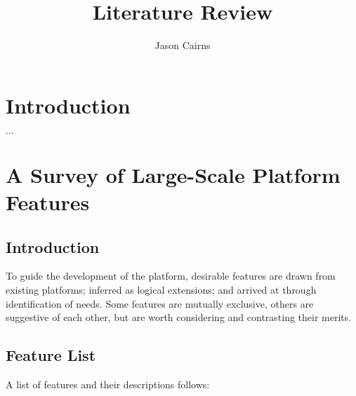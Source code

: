 \documentclass[a4paper,10pt]{article}
\begin{document}
\title{Literature Review}
\author{Jason Cairns}
  
\maketitle{}

\tableofcontents

\section{Introduction}

\(\dots\)

\section{A Survey of Large-Scale Platform Features}

\subsection{Introduction}\label{sec:intro}

To guide the development of the platform, desirable features are drawn from
existing platforms; inferred as logical extensions; and arrived at through
identification of needs. Some features are mutually exclusive, others are
suggestive of each other, but are worth considering and contrasting their
merits.

\subsection{Feature List}\label{sec:feature-list}

A list of features and their descriptions follows:
\end{document}
